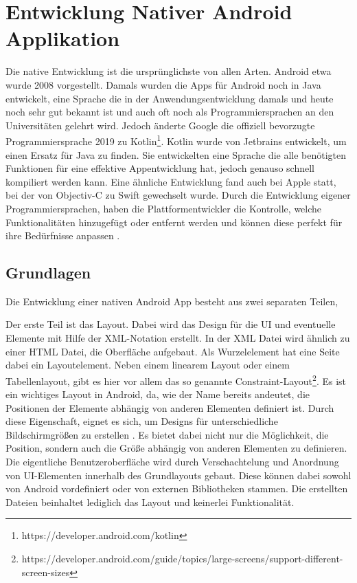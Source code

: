 \section{Entwicklung Nativer Android Applikation}
Die native Entwicklung ist die ursprünglichste von allen Arten. Android etwa wurde 2008 vorgestellt. 
Damals wurden die Apps für Android noch in Java entwickelt, eine Sprache die in der Anwendungsentwicklung damals und heute noch sehr gut bekannt ist und auch oft noch als Programmiersprachen an den Universitäten gelehrt wird. 
Jedoch änderte Google die offiziell bevorzugte Programmiersprache 2019 zu Kotlin\footnote{https://developer.android.com/kotlin}. 
Kotlin wurde von Jetbrains entwickelt, um einen Ersatz für Java zu finden. 
Sie entwickelten eine Sprache die alle benötigten Funktionen für eine effektive Appentwicklung hat, jedoch genauso schnell kompiliert werden kann. 
Eine ähnliche Entwicklung fand auch bei Apple statt, bei der von Objectiv-C zu Swift gewechselt wurde. 
Durch die Entwicklung eigener Programmiersprachen, haben die Plattformentwickler die Kontrolle, welche Funktionalitäten hinzugefügt oder entfernt werden und können diese perfekt für ihre Bedürfnisse anpassen \cite{medium_Swift_Kotlin}.

\subsection{Grundlagen}
Die Entwicklung einer nativen Android App besteht aus zwei separaten Teilen, 

Der erste Teil ist das Layout. Dabei wird das Design für die UI und eventuelle Elemente mit Hilfe der XML-Notation erstellt.
In der XML Datei wird ähnlich zu einer HTML Datei, die Oberfläche aufgebaut. Als Wurzelelement hat eine Seite dabei ein Layoutelement. Neben einem linearem Layout oder einem Tabellenlayout, gibt es hier vor allem das so genannte Constraint-Layout\footnote{https://developer.android.com/guide/topics/large-screens/support-different-screen-sizes}. 
Es ist ein wichtiges Layout in Android, da, wie der Name bereits andeutet, die Positionen der Elemente abhängig von anderen Elementen definiert ist. Durch diese Eigenschaft, eignet es sich, um Designs für unterschiedliche Bildschirmgrößen zu erstellen \cite{ConstraintLayout_Android}. Es bietet dabei nicht nur die Möglichkeit, die Position, sondern auch die Größe abhängig von anderen Elementen zu definieren.
Die eigentliche Benutzeroberfläche wird durch Verschachtelung und Anordnung von UI-Elementen innerhalb des Grundlayouts gebaut. Diese können dabei sowohl von Android vordefiniert oder von externen Bibliotheken stammen. Die erstellten Dateien beinhaltet lediglich das Layout und keinerlei Funktionalität.

